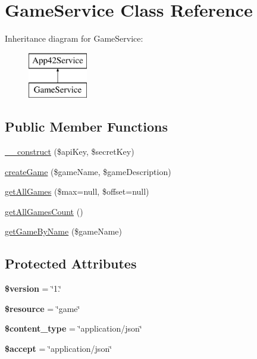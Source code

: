 \hypertarget{class_game_service}{\section{Game\+Service Class Reference}
\label{class_game_service}
}
Inheritance diagram for Game\+Service\+:\begin{figure}[H]
\begin{center}
\leavevmode
\includegraphics[height=2.000000cm]{class_game_service}
\end{center}
\end{figure}
\subsection*{Public Member Functions}
\begin{DoxyCompactItemize}
\item 
\hyperlink{class_game_service_a49f2ad222e06420736d750e167d55d7c}{\+\_\+\+\_\+construct} (\$api\+Key, \$secret\+Key)
\item 
\hyperlink{class_game_service_a0cc7c4e59588f9a72642fa6c4bb9961a}{create\+Game} (\$game\+Name, \$game\+Description)
\item 
\hyperlink{class_game_service_af2a2e485f298fdd02404f143d7fe2647}{get\+All\+Games} (\$max=null, \$offset=null)
\item 
\hyperlink{class_game_service_a163be10ed0287d40818313f52b8b0ffb}{get\+All\+Games\+Count} ()
\item 
\hyperlink{class_game_service_afb9df56b00f8449e3be59543599a39f6}{get\+Game\+By\+Name} (\$game\+Name)
\end{DoxyCompactItemize}
\subsection*{Protected Attributes}
\begin{DoxyCompactItemize}
\item 
\hypertarget{class_game_service_a17c8948c68aa44fa9961ae169b6a8961}{{\bfseries \$version} = \char`\"{}1.\char`\"{}}\label{class_game_service_a17c8948c68aa44fa9961ae169b6a8961}

\item 
\hypertarget{class_game_service_abd4c7b8b084214b8d2533ba07fce6b83}{{\bfseries \$resource} = \char`\"{}game\char`\"{}}\label{class_game_service_abd4c7b8b084214b8d2533ba07fce6b83}

\item 
\hypertarget{class_game_service_ae754d6373f275e781f47c8bc9b994b6d}{{\bfseries \$content\+\_\+type} = \char`\"{}application/json\char`\"{}}\label{class_game_service_ae754d6373f275e781f47c8bc9b994b6d}

\item 
\hypertarget{class_game_service_a75fc18c4ff06288ff9fdf8aba9bd1081}{{\bfseries \$accept} = \char`\"{}application/json\char`\"{}}\label{class_game_service_a75fc18c4ff06288ff9fdf8aba9bd1081}

\end{DoxyCompactItemize}
